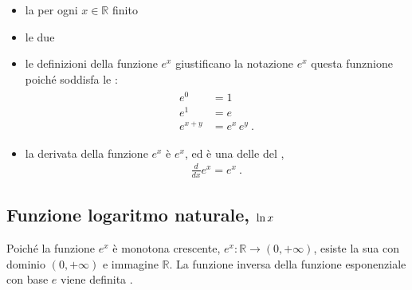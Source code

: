 \documentclass[letterpaper,10pt,italian]{jupyterBook}
\begin{document}
\begin{itemize}
\item {} 
\sphinxAtStartPar
la {\hyperref[\detokenize{ch/exponential_logarithm-proof:math-hs-exp-log-proof-convergence}]{}} per ogni \(x \in \mathbb{R}\) finito

\item {} 
\sphinxAtStartPar
le due {\hyperref[\detokenize{ch/exponential_logarithm-proof:math-hs-exp-log-proof-equivalence}]{}}

\item {} 
\sphinxAtStartPar
le definizioni della funzione \(e^x\) giustificano la notazione \(e^x\) questa funznione poiché soddisfa le {\hyperref[\detokenize{ch/exponential_logarithm-proof:math-hs-exp-log-proof-powers}]{}}:
\begin{equation*}
\begin{split}\begin{aligned}
    e^0 & = 1 \\
    e^1 & = e \\
  e^{x+y} & = e^x \, e^y \ .
  \end{aligned}\end{split}
\end{equation*}
\item {} 
\sphinxAtStartPar
la derivata della funzione \(e^x\) è \(e^x\), ed è una delle {\hyperref[\detokenize{ch/infinitesimal_calculus/derivatives:infinitesimal-calculus-derivatives-fund}]{}} del {\hyperref[\detokenize{ch/infinitesimal_calculus/derivatives:infinitesimal-calculus-derivatives}]{}},
\begin{equation*}
\begin{split}\frac{d}{dx} e^x = e^x \ .\end{split}
\end{equation*}
\end{itemize}




\subsection{Funzione logaritmo naturale, \protect\(\text{ln} \, x\protect\)}
\label{\detokenize{ch/exponential_logarithm:funzione-logaritmo-naturale-text-ln-x}}
\sphinxAtStartPar
{} Poiché la funzione \(e^x\) è monotona crescente, \(e^x: \mathbb{R} \rightarrow (0, +\infty)\), esiste la sua {\hyperref[\detokenize{ch/precalculus/real-functions:math-hs-precalculus-real-functions-inverse}]{}} con dominio \((0,+\infty)\) e immagine \(\mathbb{R}\). La funzione inversa della funzione esponenziale con base \(e\) viene definita .
\end{document}
